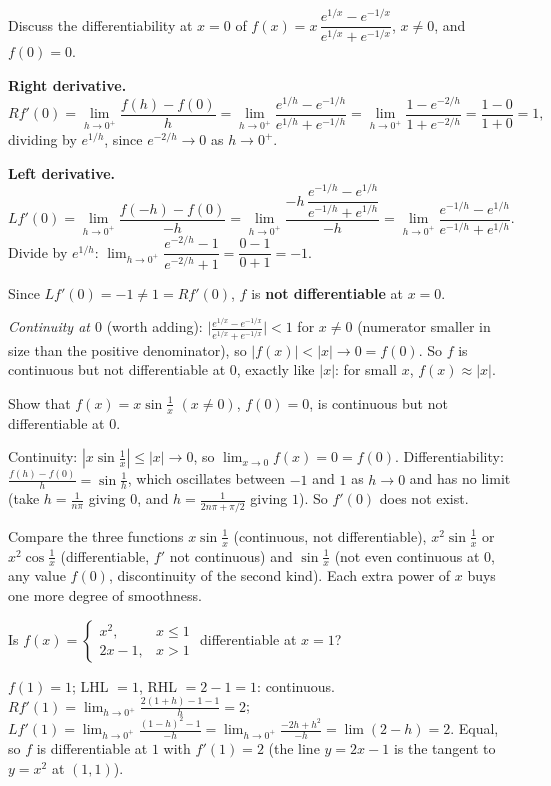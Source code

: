 \begin{example}[DU 12910 Q1(c)]
Discuss the differentiability at $x=0$ of $f(x)=x\,\dfrac{e^{1/x}-e^{-1/x}}{e^{1/x}+e^{-1/x}}$, $x\ne0$, and $f(0)=0$.
\end{example}
\begin{solution}
\textbf{Right derivative.}
\[
Rf'(0)=\lim_{h\to0^+}\frac{f(h)-f(0)}{h}=\lim_{h\to0^+}\frac{e^{1/h}-e^{-1/h}}{e^{1/h}+e^{-1/h}}=\lim_{h\to0^+}\frac{1-e^{-2/h}}{1+e^{-2/h}}=\frac{1-0}{1+0}=1,
\]
dividing by $e^{1/h}$, since $e^{-2/h}\to0$ as $h\to0^+$.

\textbf{Left derivative.}
\[
Lf'(0)=\lim_{h\to0^+}\frac{f(-h)-f(0)}{-h}=\lim_{h\to0^+}\frac{-h\,\dfrac{e^{-1/h}-e^{1/h}}{e^{-1/h}+e^{1/h}}}{-h}=\lim_{h\to0^+}\frac{e^{-1/h}-e^{1/h}}{e^{-1/h}+e^{1/h}} .
\]
Divide by $e^{1/h}$: $\lim_{h\to0^+}\dfrac{e^{-2/h}-1}{e^{-2/h}+1}=\dfrac{0-1}{0+1}=-1$.

Since $Lf'(0)=-1\ne1=Rf'(0)$, $f$ is \textbf{not differentiable} at $x=0$.

\emph{Continuity at $0$} (worth adding): $\bigl|\frac{e^{1/x}-e^{-1/x}}{e^{1/x}+e^{-1/x}}\bigr|<1$ for $x\ne0$ (numerator smaller in size than the positive denominator), so $|f(x)|<|x|\to0=f(0)$. So $f$ is continuous but not differentiable at $0$, exactly like $|x|$: for small $x$, $f(x)\approx|x|$.
\end{solution}

\begin{example}
Show that $f(x)=x\sin\frac1x$ $(x\ne0)$, $f(0)=0$, is continuous but not differentiable at $0$.
\end{example}
\begin{solution}
Continuity: $|x\sin\frac1x|\le|x|\to0$, so $\lim_{x\to0}f(x)=0=f(0)$. Differentiability: $\frac{f(h)-f(0)}{h}=\sin\frac1h$, which oscillates between $-1$ and $1$ as $h\to0$ and has no limit (take $h=\frac{1}{n\pi}$ giving $0$, and $h=\frac{1}{2n\pi+\pi/2}$ giving $1$). So $f'(0)$ does not exist.
\end{solution}
Compare the three functions $x\sin\frac1x$ (continuous, not differentiable), $x^2\sin\frac1x$ or $x^2\cos\frac1x$ (differentiable, $f'$ not continuous) and $\sin\frac1x$ (not even continuous at $0$, any value $f(0)$, discontinuity of the second kind). Each extra power of $x$ buys one more degree of smoothness.

\begin{example}
Is $f(x)=\begin{cases}x^2,&x\le1\\ 2x-1,&x>1\end{cases}$ differentiable at $x=1$?
\end{example}
\begin{solution}
$f(1)=1$; LHL $=1$, RHL $=2-1=1$: continuous.
$Rf'(1)=\lim_{h\to0^+}\frac{2(1+h)-1-1}{h}=2$;
$Lf'(1)=\lim_{h\to0^+}\frac{(1-h)^2-1}{-h}=\lim_{h\to0^+}\frac{-2h+h^2}{-h}=\lim(2-h)=2$.
Equal, so $f$ is differentiable at $1$ with $f'(1)=2$ (the line $y=2x-1$ is the tangent to $y=x^2$ at $(1,1)$).
\end{solution}

